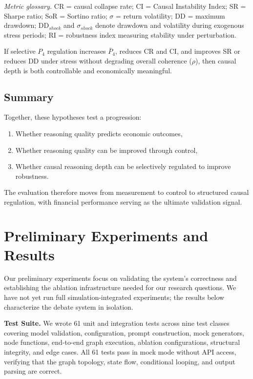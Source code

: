 \documentclass{article}
\begin{document}
\noindent\textit{Metric glossary.}
CR = causal collapse rate; 
CI = Causal Instability Index; 
SR = Sharpe ratio; 
SoR = Sortino ratio; 
$\sigma$ = return volatility; 
DD = maximum drawdown; 
DD$_{shock}$ and $\sigma_{shock}$ denote drawdown and volatility during exogenous stress periods; 
RI = robustness index measuring stability under perturbation.

If selective $P_4$ regulation increases $\bar{P}_4$, reduces CR and CI, and improves SR or reduces DD under stress without degrading overall coherence ($\rho$), then causal depth is both controllable and economically meaningful.
\subsection{Summary}

Together, these hypotheses test a progression:

\begin{enumerate}
    \item Whether reasoning quality predicts economic outcomes,
    \item Whether reasoning quality can be improved through control,
    \item Whether causal reasoning depth can be selectively regulated to improve robustness.
\end{enumerate}

The evaluation therefore moves from measurement to control to structured causal regulation, with financial performance serving as the ultimate validation signal.

\vspace{-6pt}
\section{Preliminary Experiments and Results}

Our preliminary experiments focus on validating the system's correctness and establishing the ablation infrastructure needed for our research questions. We have not yet run full simulation-integrated experiments; the results below characterize the debate system in isolation.

\textbf{Test Suite.}
We wrote 61 unit and integration tests across nine test classes covering model validation, configuration, prompt construction, mock generators, node functions, end-to-end graph execution, ablation configurations, structural integrity, and edge cases. All 61 tests pass in mock mode without API access, verifying that the graph topology, state flow, conditional looping, and output parsing are correct.
\end{document}
